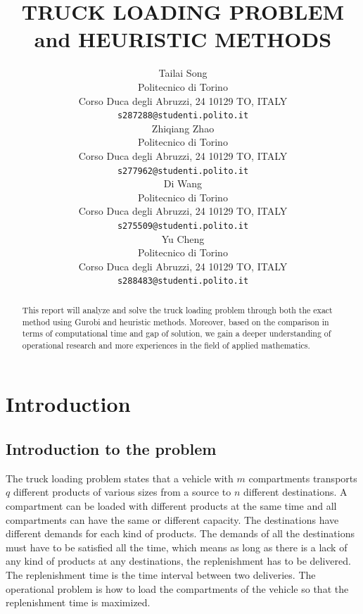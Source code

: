 \documentclass{article}
\title{TRUCK LOADING PROBLEM and HEURISTIC METHODS}
\author{
 Tailai Song \\
    Politecnico di Torino \\
    Corso Duca degli Abruzzi, 24 10129 TO, ITALY \\
  \texttt{s287288@studenti.polito.it} \\
   \And
 Zhiqiang Zhao \\
    Politecnico di Torino \\
    Corso Duca degli Abruzzi, 24 10129 TO, ITALY \\
  \texttt{s277962@studenti.polito.it} \\
    \And
 Di Wang \\
    Politecnico di Torino \\
    Corso Duca degli Abruzzi, 24 10129 TO, ITALY \\
  \texttt{s275509@studenti.polito.it} \\
    \And
 Yu Cheng \\
    Politecnico di Torino \\
    Corso Duca degli Abruzzi, 24 10129 TO, ITALY \\
  \texttt{s288483@studenti.polito.it} \\
}
\begin{document}
\maketitle
\begin{abstract}
This report will analyze and solve the truck loading problem through both the exact method using Gurobi and heuristic methods. Moreover, based on the comparison in terms of computational time and gap of solution, we gain a deeper understanding of operational research and more experiences in the field of applied mathematics.
\end{abstract}




\section{Introduction}
\label{sec:intro}
\subsection{Introduction to the problem}
The truck loading problem states that a vehicle with $m$ compartments transports $q$ different products of various sizes from a source to $n$ different destinations. A compartment can be loaded with different products at the same time and all compartments can have the same or different capacity. The destinations have different demands for each kind of products. The demands of all the destinations must have to be satisfied all the time, which means as long as there is a lack of any kind of products at any destinations, the replenishment has to be delivered. The replenishment time is the time interval between two deliveries. The operational problem is how to load the compartments of the vehicle so that the replenishment time is maximized.
\end{document}
